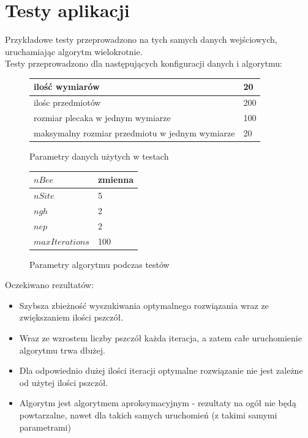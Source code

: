 \documentclass[a4paper,12pt,notitlepage]{mwrep}
\begin{document}
\chapter{Testy aplikacji}
Przykładowe testy przeprowadzono na tych samych danych wejściowych, uruchamiając algorytm wielokrotnie.\\
Testy przeprowadzono dla następujących konfiguracji danych i algorytmu:
\begin{figure}[H]
\begin{center}
	\begin{tabular}{ | p{7.5cm} | p{1.5cm} | } \hline
	ilość wymiarów	&	20 \\\hline
	ilośc przedmiotów	&	200 \\\hline
	rozmiar plecaka w jednym wymiarze	&	100 \\\hline
	maksymalny rozmiar przedmiotu w jednym wymiarze	& 20 \\\hline
	\end{tabular}
\end{center}
\caption{Parametry danych użytych w testach}
\label{fig:testparams}
\end{figure}

\begin{figure}[H]
\begin{center}
	\begin{tabular}{ | p{7.5cm} | p{1.5cm} | } \hline
	$nBee$	&	zmienna \\\hline
	$nSite$	&	5 \\\hline
	$ngh$	&	2 \\\hline
	$nep$	&	2 \\\hline
	$maxIterations$	&	100 \\\hline
	\end{tabular}
\end{center}
\caption{Parametry algorytmu podczas testów}
\label{fig:algparams}
\end{figure}

\noindent
Oczekiwano rezultatów:
\begin{itemize}
	\item	Szybsza zbieżność wyszukiwania optymalnego rozwiązania
			wraz ze zwiększaniem ilości pszczół.
	\item	Wraz ze wzrostem liczby pszczół każda iteracja, a zatem całe uruchomienie algorytmu trwa dłużej.
	\item	Dla odpowiednio dużej ilości iteracji optymalne rozwiązanie nie jest zależne od
			użytej ilości pszczół.
	\item	Algorytm jest algorytmem aproksymacyjnym - rezultaty na ogół nie będą powtarzalne,
			nawet dla takich samych uruchomień (z takimi samymi parametrami)
\end{itemize}
\end{document}
